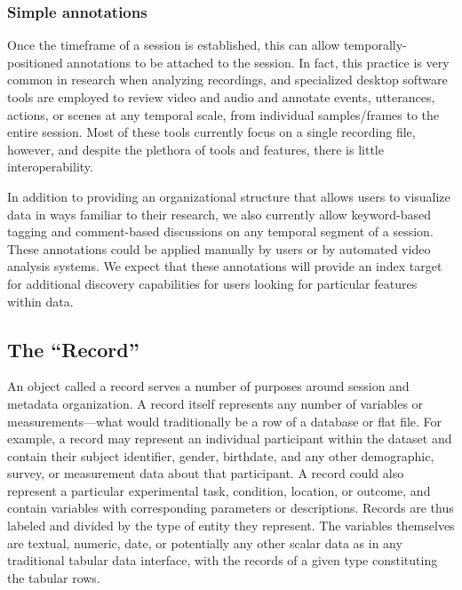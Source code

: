 \documentclass{sig-alternate}
\begin{document}
\subsubsection{Simple annotations}

Once the timeframe of a session is established, this can allow temporally-positioned annotations to be attached to the session.
In fact, this practice is very common in research when analyzing recordings, and specialized desktop software tools are employed to review video and audio and annotate events, utterances, actions, or scenes at any temporal scale, from individual samples/frames to the entire session.
Most of these tools currently focus on a single recording file, however, and despite the plethora of tools and features, there is little interoperability.

In addition to providing an organizational structure that allows users to visualize data in ways familiar to their research, we also currently allow keyword-based tagging and comment-based discussions on any temporal segment of a session.
These annotations could be applied manually by users or by automated video analysis systems.
We expect that these annotations will provide an index target for additional discovery capabilities for users looking for particular features within data.


\subsection{The ``Record''}

An object called a record serves a number of purposes around session and metadata organization. 
A record itself represents any number of variables or measurements---what would traditionally be a row of a database or flat file.
For example, a record may represent an individual participant within the dataset and contain their subject identifier, gender, birthdate, and any other demographic, survey, or measurement data about that participant.
A record could also represent a particular experimental task, condition, location, or outcome, and contain variables with corresponding parameters or descriptions.
Records are thus labeled and divided by the type of entity they represent.
The variables themselves are textual, numeric, date, or potentially any other scalar data as in any traditional tabular data interface, with the records of a given type constituting the tabular rows.
\end{document}
